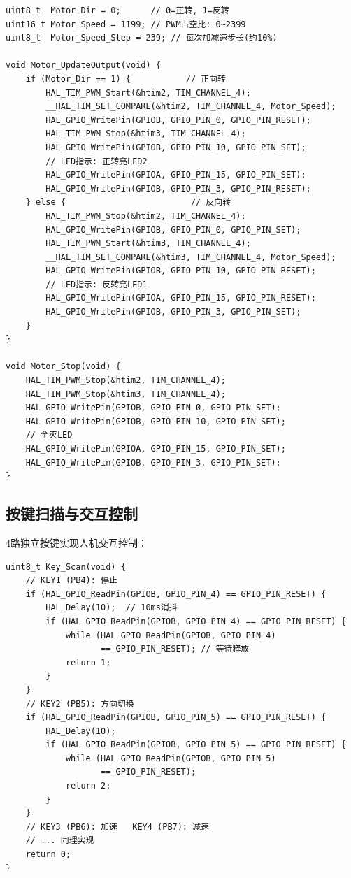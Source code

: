 \documentclass[12pt,a4paper]{ctexart}
\begin{document}
\begin{lstlisting}[style=cstyle, caption={H桥交叉控制——正反转+速度调节}]
uint8_t  Motor_Dir = 0;      // 0=正转, 1=反转
uint16_t Motor_Speed = 1199; // PWM占空比: 0~2399
uint8_t  Motor_Speed_Step = 239; // 每次加减速步长(约10%)

void Motor_UpdateOutput(void) {
    if (Motor_Dir == 1) {           // 正向转
        HAL_TIM_PWM_Start(&htim2, TIM_CHANNEL_4);
        __HAL_TIM_SET_COMPARE(&htim2, TIM_CHANNEL_4, Motor_Speed);
        HAL_GPIO_WritePin(GPIOB, GPIO_PIN_0, GPIO_PIN_RESET);
        HAL_TIM_PWM_Stop(&htim3, TIM_CHANNEL_4);
        HAL_GPIO_WritePin(GPIOB, GPIO_PIN_10, GPIO_PIN_SET);
        // LED指示: 正转亮LED2
        HAL_GPIO_WritePin(GPIOA, GPIO_PIN_15, GPIO_PIN_SET);
        HAL_GPIO_WritePin(GPIOB, GPIO_PIN_3, GPIO_PIN_RESET);
    } else {                         // 反向转
        HAL_TIM_PWM_Stop(&htim2, TIM_CHANNEL_4);
        HAL_GPIO_WritePin(GPIOB, GPIO_PIN_0, GPIO_PIN_SET);
        HAL_TIM_PWM_Start(&htim3, TIM_CHANNEL_4);
        __HAL_TIM_SET_COMPARE(&htim3, TIM_CHANNEL_4, Motor_Speed);
        HAL_GPIO_WritePin(GPIOB, GPIO_PIN_10, GPIO_PIN_RESET);
        // LED指示: 反转亮LED1
        HAL_GPIO_WritePin(GPIOA, GPIO_PIN_15, GPIO_PIN_RESET);
        HAL_GPIO_WritePin(GPIOB, GPIO_PIN_3, GPIO_PIN_SET);
    }
}

void Motor_Stop(void) {
    HAL_TIM_PWM_Stop(&htim2, TIM_CHANNEL_4);
    HAL_TIM_PWM_Stop(&htim3, TIM_CHANNEL_4);
    HAL_GPIO_WritePin(GPIOB, GPIO_PIN_0, GPIO_PIN_SET);
    HAL_GPIO_WritePin(GPIOB, GPIO_PIN_10, GPIO_PIN_SET);
    // 全灭LED
    HAL_GPIO_WritePin(GPIOA, GPIO_PIN_15, GPIO_PIN_SET);
    HAL_GPIO_WritePin(GPIOB, GPIO_PIN_3, GPIO_PIN_SET);
}
\end{lstlisting}

\subsection{按键扫描与交互控制}

4路独立按键实现人机交互控制：

\begin{lstlisting}[style=cstyle, caption={4键扫描——消抖+等待释放}]
uint8_t Key_Scan(void) {
    // KEY1 (PB4): 停止
    if (HAL_GPIO_ReadPin(GPIOB, GPIO_PIN_4) == GPIO_PIN_RESET) {
        HAL_Delay(10);  // 10ms消抖
        if (HAL_GPIO_ReadPin(GPIOB, GPIO_PIN_4) == GPIO_PIN_RESET) {
            while (HAL_GPIO_ReadPin(GPIOB, GPIO_PIN_4)
                   == GPIO_PIN_RESET); // 等待释放
            return 1;
        }
    }
    // KEY2 (PB5): 方向切换
    if (HAL_GPIO_ReadPin(GPIOB, GPIO_PIN_5) == GPIO_PIN_RESET) {
        HAL_Delay(10);
        if (HAL_GPIO_ReadPin(GPIOB, GPIO_PIN_5) == GPIO_PIN_RESET) {
            while (HAL_GPIO_ReadPin(GPIOB, GPIO_PIN_5)
                   == GPIO_PIN_RESET);
            return 2;
        }
    }
    // KEY3 (PB6): 加速   KEY4 (PB7): 减速
    // ... 同理实现
    return 0;
}
\end{lstlisting}
\end{document}
